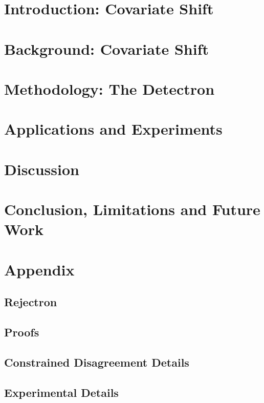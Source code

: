 \documentclass{ut-thesis}
\begin{document}
    \chapter[Introduction]{Introduction: Covariate Shift}
    \label{ch:intro}

    


    \chapter[Background: Covariate Shift]{Background: Covariate Shift}\label{ch:related}

    

    \chapter[Methodology: The Detectron]{Methodology: The Detectron}\label{ch:detectron}

    


    \chapter{Applications and Experiments}\label{ch:experiments}
    


    \chapter{Discussion}\label{ch:discussion}
    


    \chapter{Conclusion, Limitations and Future Work}\label{ch:conclusion}
    

    

    \appendix


    \chapter{Appendix}\label{ch:appendix}


    \section{Rejectron}\label{sec:rejectron}
    


    \section{Proofs}\label{sec:proofs}
    

    \section{Constrained Disagreement Details}
    \label{sec:cons_dis_det}
    

    \section{Experimental Details}
    \label{sec:expdet}
    
\end{document}
